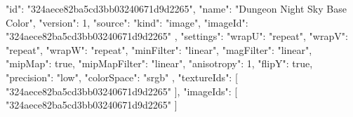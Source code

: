 {
  "id": "324aece82ba5cd3bb03240671d9d2265",
  "name": "Dungeon Night Sky Base Color",
  "version": 1,
  "source": {
    "kind": "image",
    "imageId": "324aece82ba5cd3bb03240671d9d2265"
  },
  "settings": {
    "wrapU": "repeat",
    "wrapV": "repeat",
    "wrapW": "repeat",
    "minFilter": "linear",
    "magFilter": "linear",
    "mipMap": true,
    "mipMapFilter": "linear",
    "anisotropy": 1,
    "flipY": true,
    "precision": "low",
    "colorSpace": "srgb"
  },
  "textureIds": [
    "324aece82ba5cd3bb03240671d9d2265"
  ],
  "imageIds": [
    "324aece82ba5cd3bb03240671d9d2265"
  ]
}
